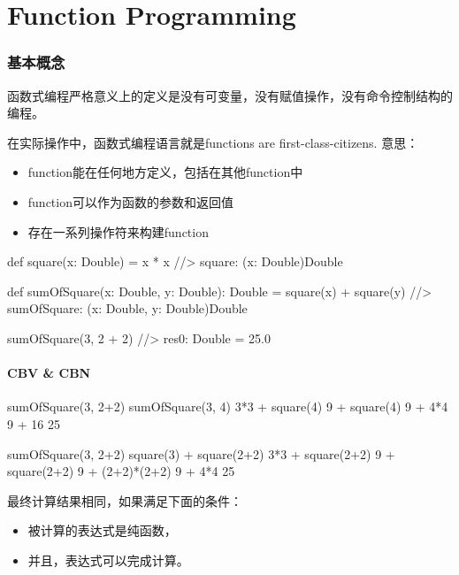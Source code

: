 \chapter{Function Programming}

\subsection{基本概念}

函数式编程严格意义上的定义是没有可变量，没有赋值操作，没有命令控制结构的编程。

在实际操作中，函数式编程语言就是functions are first-class-citizens.
意思：
\begin{itemize}
\item function能在任何地方定义，包括在其他function中
\item function可以作为函数的参数和返回值
\item 存在一系列操作符来构建function
\end{itemize}

\begin{Scala}
  def square(x: Double) = x * x                   //> square: (x: Double)Double
  
  def sumOfSquare(x: Double, y: Double): Double = square(x) + square(y)
                                                  //> sumOfSquare: (x: Double, y: Double)Double
  
  sumOfSquare(3, 2 + 2)                           //> res0: Double = 25.0
\end{Scala}

\subsubsection{CBV \& CBN}

\begin{Scala}
sumOfSquare(3, 2+2)
sumOfSquare(3, 4)
3*3 + square(4)
9 + square(4)
9 + 4*4
9 + 16
25
\end{Scala}

\begin{Scala}
sumOfSquare(3, 2+2)
square(3) + square(2+2)
3*3 + square(2+2)
9 + square(2+2)
9 + (2+2)*(2+2)
9 + 4*4
25
\end{Scala}

最终计算结果相同，如果满足下面的条件：
\begin{itemize}
\item 被计算的表达式是纯函数，
\item 并且，表达式可以完成计算。
\end{itemize}

